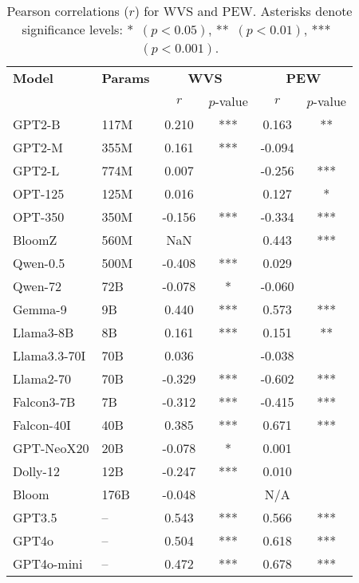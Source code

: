 \documentclass[11pt]{article}
\begin{document}
\begin{table}[ht]
\centering
\scriptsize
\renewcommand{\arraystretch}{1.0}
\vspace{-5pt}
\caption{\small Pearson correlations ($r$) for WVS and PEW. Asterisks denote significance levels: *~$(p<0.05)$, **~$(p<0.01)$, ***~$(p<0.001)$.}
\vspace{-5pt}
\begin{tabular}{llcccc}

\toprule
\textbf{Model} & \textbf{Params} & \multicolumn{2}{c}{\textbf{WVS}} & \multicolumn{2}{c}{\textbf{PEW}} \\
\cmidrule(lr){3-4} \cmidrule(lr){5-6}
 & & $r$ &  $p$-value & $r$ &  $p$-value \\
\midrule
GPT2-B         & 117M   & 0.210 & *** & 0.163 & **  \\
GPT2-M         & 355M   & 0.161 & *** & -0.094 &     \\
GPT2-L         & 774M   & 0.007 &     & -0.256 & *** \\
OPT-125        & 125M   & 0.016 &     & 0.127  & *   \\
OPT-350        & 350M   & -0.156 & *** & -0.334 & *** \\
BloomZ         & 560M   & NaN   &     & 0.443  & *** \\
Qwen-0.5       & 500M   & -0.408 & *** & 0.029  &     \\
Qwen-72        & 72B    & -0.078 & *   & -0.060 &     \\
Gemma-9        & 9B     & 0.440  & *** & 0.573  & *** \\
Llama3-8B      & 8B     & 0.161  & *** & 0.151  & **  \\
Llama3.3-70I   & 70B    & 0.036  &     & -0.038 &     \\
Llama2-70      & 70B    & -0.329 & *** & -0.602 & *** \\
Falcon3-7B     & 7B     & -0.312 & *** & -0.415 & *** \\
Falcon-40I     & 40B    & 0.385  & *** & 0.671  & *** \\
GPT-NeoX20     & 20B    & -0.078 & *   & 0.001  &     \\
Dolly-12       & 12B    & -0.247 & *** & 0.010  &     \\
Bloom          & 176B   & -0.048 &     & N/A    &     \\
GPT3.5         & --     & 0.543  & *** & 0.566  & *** \\
GPT4o          & --     & 0.504  & *** & 0.618  & *** \\
GPT4o-mini     & --     & 0.472  & *** & 0.678  & *** \\
\bottomrule
\end{tabular}

\label{tab:AllCorrelationsStars}
\end{table}
\vspace{-5pt}
\end{document}
